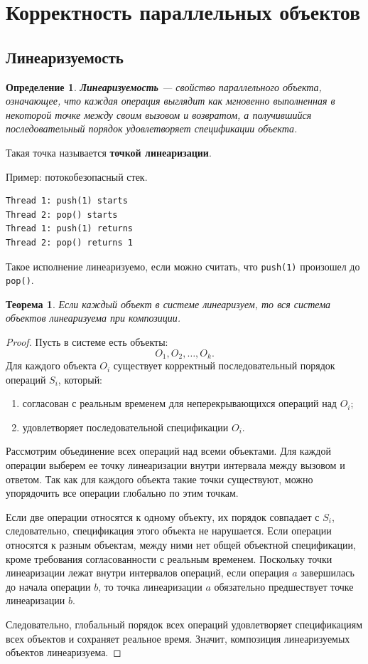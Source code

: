 \documentclass[12pt,a4paper]{article}
\newtheorem{definition}{Определение}
\newtheorem{theorem}{Теорема}
\begin{document}
\section{Корректность параллельных объектов}

\subsection{Линеаризуемость}

\begin{definition}
\textbf{Линеаризуемость} --- свойство параллельного объекта, означающее, что каждая операция выглядит как мгновенно выполненная в некоторой точке между своим вызовом и возвратом, а получившийся последовательный порядок удовлетворяет спецификации объекта.
\end{definition}

Такая точка называется \textbf{точкой линеаризации}.

Пример: потокобезопасный стек.

\begin{lstlisting}
Thread 1: push(1) starts
Thread 2: pop() starts
Thread 1: push(1) returns
Thread 2: pop() returns 1
\end{lstlisting}

Такое исполнение линеаризуемо, если можно считать, что \texttt{push(1)} произошел до \texttt{pop()}.

\begin{theorem}
Если каждый объект в системе линеаризуем, то вся система объектов линеаризуема при композиции.
\end{theorem}

\begin{proof}
Пусть в системе есть объекты:
\[
O_1, O_2, \dots, O_k.
\]
Для каждого объекта $O_i$ существует корректный последовательный порядок операций $S_i$, который:
\begin{enumerate}
    \item согласован с реальным временем для неперекрывающихся операций над $O_i$;
    \item удовлетворяет последовательной спецификации $O_i$.
\end{enumerate}

Рассмотрим объединение всех операций над всеми объектами. Для каждой операции выберем ее точку линеаризации внутри интервала между вызовом и ответом. Так как для каждого объекта такие точки существуют, можно упорядочить все операции глобально по этим точкам.

Если две операции относятся к одному объекту, их порядок совпадает с $S_i$, следовательно, спецификация этого объекта не нарушается. Если операции относятся к разным объектам, между ними нет общей объектной спецификации, кроме требования согласованности с реальным временем. Поскольку точки линеаризации лежат внутри интервалов операций, если операция $a$ завершилась до начала операции $b$, то точка линеаризации $a$ обязательно предшествует точке линеаризации $b$.

Следовательно, глобальный порядок всех операций удовлетворяет спецификациям всех объектов и сохраняет реальное время. Значит, композиция линеаризуемых объектов линеаризуема.
\end{proof}
\end{document}
